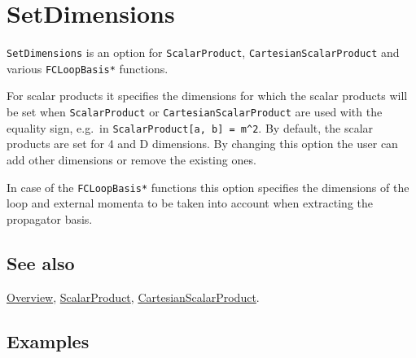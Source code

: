 \documentclass[../FeynCalcManual.tex]{subfiles}
\begin{document}
\hypertarget{setdimensions}{%
\section{SetDimensions}\label{setdimensions}}

\texttt{SetDimensions} is an option for \texttt{ScalarProduct},
\texttt{CartesianScalarProduct} and various \texttt{FCLoopBasis*}
functions.

For scalar products it specifies the dimensions for which the scalar
products will be set when \texttt{ScalarProduct} or
\texttt{CartesianScalarProduct} are used with the equality sign, e.g.~in
\texttt{ScalarProduct[\allowbreak{}a,\ \allowbreak{}b] = m^2}. By
default, the scalar products are set for 4 and D dimensions. By changing
this option the user can add other dimensions or remove the existing
ones.

In case of the \texttt{FCLoopBasis*} functions this option specifies the
dimensions of the loop and external momenta to be taken into account
when extracting the propagator basis.

\subsection{See also}

\hyperlink{toc}{Overview}, \hyperlink{scalarproduct}{ScalarProduct},
\hyperlink{cartesianscalarproduct}{CartesianScalarProduct}.

\subsection{Examples}
\end{document}
